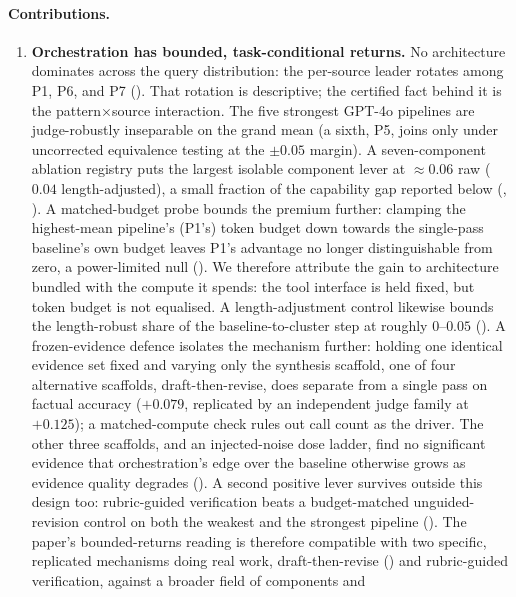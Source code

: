 \documentclass[11pt]{article}
\begin{document}
\paragraph{Contributions.}
\begin{enumerate}[leftmargin=1.5em,itemsep=2pt,topsep=2pt]
\item \textbf{Orchestration has bounded, task-conditional returns.} No architecture
dominates across the query distribution: the per-source leader rotates among P1, P6,
and P7 (). That rotation is descriptive; the certified fact behind
it is the pattern$\times$source interaction. The five strongest GPT-4o pipelines are judge-robustly
inseparable on the grand mean (a sixth, P5, joins only under uncorrected equivalence
testing at the $\pm0.05$ margin). A seven-component ablation registry puts the largest isolable
component lever at
$\approx\!0.06$ raw ($0.04$ length-adjusted), a small fraction of the capability gap reported
below (,
). A matched-budget probe bounds the premium further: clamping the
highest-mean pipeline's (P1's) token budget down towards the single-pass baseline's own
budget leaves P1's advantage no longer distinguishable from zero, a power-limited null
(). We therefore attribute the gain to architecture bundled with the
compute it spends: the tool interface is held
fixed, but token budget is not equalised. A length-adjustment control likewise bounds the
length-robust share of the baseline-to-cluster step at roughly $0$--$0.05$
(). A frozen-evidence defence isolates the mechanism further:
holding one
identical evidence set fixed and varying only the synthesis scaffold, one of four
alternative scaffolds, draft-then-revise, does separate from a single pass on factual accuracy
($+0.079$, replicated by an independent judge family at $+0.125$); a matched-compute check rules
out call count as the driver. The other three scaffolds, and an injected-noise dose ladder, find no
significant evidence that
orchestration's edge over the baseline otherwise grows as evidence quality degrades
(). A second positive lever survives outside this design
too: rubric-guided verification beats a budget-matched unguided-revision control on
both the weakest and the strongest pipeline (). The paper's bounded-returns
reading is therefore compatible with two specific, replicated mechanisms doing real work,
draft-then-revise () and rubric-guided verification, against a broader field of components and

\end{enumerate}
\end{document}
